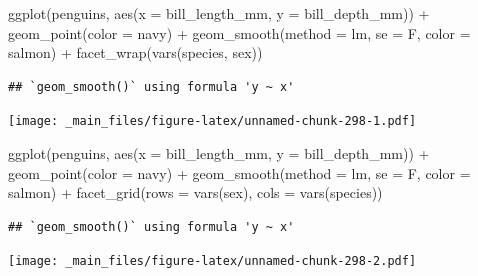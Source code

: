 \documentclass[
]{book}
\newenvironment{Shaded}{\begin{snugshade}}{\end{snugshade}}
\newcommand{\AttributeTok}[1]{\textcolor[rgb]{0.77,0.63,0.00}{#1}}
\newcommand{\FunctionTok}[1]{\textcolor[rgb]{0.00,0.00,0.00}{#1}}
\newcommand{\NormalTok}[1]{#1}
\newcommand{\SpecialCharTok}[1]{\textcolor[rgb]{0.00,0.00,0.00}{#1}}
\newcommand{\StringTok}[1]{\textcolor[rgb]{0.31,0.60,0.02}{#1}}
\begin{document}
\begin{Shaded}
\begin{Highlighting}[]
\FunctionTok{ggplot}\NormalTok{(penguins, }\FunctionTok{aes}\NormalTok{(}\AttributeTok{x =}\NormalTok{ bill\_length\_mm, }\AttributeTok{y =}\NormalTok{ bill\_depth\_mm)) }\SpecialCharTok{+}
  \FunctionTok{geom\_point}\NormalTok{(}\AttributeTok{color =} \StringTok{\textquotesingle{}navy\textquotesingle{}}\NormalTok{) }\SpecialCharTok{+}
  \FunctionTok{geom\_smooth}\NormalTok{(}\AttributeTok{method =} \StringTok{\textquotesingle{}lm\textquotesingle{}}\NormalTok{, }\AttributeTok{se =}\NormalTok{ F, }\AttributeTok{color =} \StringTok{\textquotesingle{}salmon\textquotesingle{}}\NormalTok{) }\SpecialCharTok{+}
  \FunctionTok{facet\_wrap}\NormalTok{(}\FunctionTok{vars}\NormalTok{(species, sex))}
\end{Highlighting}
\end{Shaded}

\begin{verbatim}
## `geom_smooth()` using formula 'y ~ x'
\end{verbatim}

\texttt{[image: \_main\_files/figure-latex/unnamed-chunk-298-1.pdf]}

\begin{Shaded}
\begin{Highlighting}[]
\FunctionTok{ggplot}\NormalTok{(penguins, }\FunctionTok{aes}\NormalTok{(}\AttributeTok{x =}\NormalTok{ bill\_length\_mm, }\AttributeTok{y =}\NormalTok{ bill\_depth\_mm)) }\SpecialCharTok{+}
  \FunctionTok{geom\_point}\NormalTok{(}\AttributeTok{color =} \StringTok{\textquotesingle{}navy\textquotesingle{}}\NormalTok{) }\SpecialCharTok{+}
  \FunctionTok{geom\_smooth}\NormalTok{(}\AttributeTok{method =} \StringTok{\textquotesingle{}lm\textquotesingle{}}\NormalTok{, }\AttributeTok{se =}\NormalTok{ F, }\AttributeTok{color =} \StringTok{\textquotesingle{}salmon\textquotesingle{}}\NormalTok{) }\SpecialCharTok{+}
  \FunctionTok{facet\_grid}\NormalTok{(}\AttributeTok{rows =} \FunctionTok{vars}\NormalTok{(sex), }\AttributeTok{cols =} \FunctionTok{vars}\NormalTok{(species)) }
\end{Highlighting}
\end{Shaded}

\begin{verbatim}
## `geom_smooth()` using formula 'y ~ x'
\end{verbatim}

\texttt{[image: \_main\_files/figure-latex/unnamed-chunk-298-2.pdf]}
\end{document}
